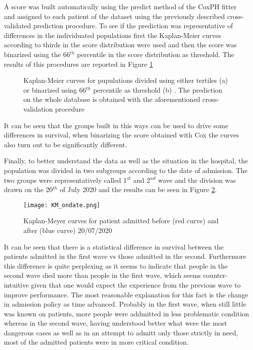 A score was built automatically using the predict method of the CoxPH fitter and assigned to each patient of the dataset using the previously described cross-validated prediction procedure.
To see if the prediction was representative of differences in the individuated populations first the Kaplan-Meier curves according to thirds in the score distribution were used and then the score was binarized using the 66$^{th}$ percentile in the score distribution as threshold.
The results of this procedures are reported in Figure \ref{fig:KmCoxScore}

\begin{figure}[H]
\centering
	\newline
        \caption{Kaplan-Meier curves for pupulations divided using either tertiles (a) or binarized using 66$^{th}$ percentile as threshold (b) . The prediction on the whole database is obtained with the aforementioned cross-validation procedure }\label{fig:KmCoxScore}
\end{figure}

It can be seen that the groups built in this ways can be used to drive some differences in survival, when binarizing the score obtained with Cox the curves also turn out to be significantly different.

Finally, to better understand the data as well as the situation in the hospital,  the population was divided in two subgroups according to the date of admission. 
The two groups were representatively called 1$^{st}$ and 2$^{nd}$ wave and the division was drawn on the 20$^{th}$ of July 2020 and the results can be seen in Figure \ref{fig:kmwaves}.

\begin{figure}
\texttt{[image: KM\_ondate.png]}
\caption{Kaplan-Meyer curves for patient admitted before (red curve) and after (blue curve) 20/07/2020 \label{fig:kmwaves}}
\end{figure}

It can be seen that there is a statistical difference in survival between the patients admitted in the first wave vs those admitted in the second. 
Furthermore this difference is quite perplexing as it seems to indicate that people in the second wave died more than people in the first wave, which seems counter-intuitive given that one would expect the experience from the previous wave to improve performance.
The most reasonable explanation for this fact is the change in admission policy as time advanced.
Probably in the first wave, when still little was known on \covid patients, more people were addmitted in less problematic condition whereas in the second wave, having understood better what were the most dangerous cases as well as in an attempt to admitt only those  strictly in need, most of the admitted patients were in more critical condition.

